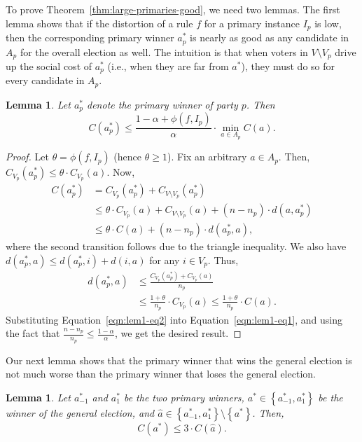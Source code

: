 \documentclass[letterpaper]{article} %
\newtheorem{lemma}[theorem]{Lemma}
\theoremstyle{definition}
\newcommand{\set}[1]{\left\{#1\right\}}
\renewcommand{\hat}{\widehat}
\newcommand{\pleft}{-1}
\newcommand{\pright}{1}
\begin{document}
To prove Theorem~\ref{thm:large-primaries-good}, we need two lemmas. The first lemma shows that if the distortion of a rule $f$ for a primary instance $I_p$ is low, then the corresponding primary winner $a^*_p$ is nearly as good as any candidate in $A_p$ for the overall election as well. The intuition is that when voters in $V \setminus V_p$ drive up the social cost of $a^*_p$ (i.e., when they are far from $a^*$), they must do so for every candidate in $A_p$.
\begin{lemma}
\label{lem:winner-opt-same-party}
	Let $a^*_p$ denote the primary winner of party $p$. Then
	$$
	C(a^*_p) \le \frac{1-\alpha+\phi(f,I_p)}{\alpha} \cdot \min_{a \in A_p} C(a).
	$$
\end{lemma}
\begin{proof}
	Let $\theta = \phi(f,I_p)$ (hence $\theta\geq 1$). Fix an arbitrary $a \in A_p$. Then, $C_{V_p}(a^*_p) \le \theta \cdot C_{V_p}(a)$. %
	Now,
	\begin{align}
	C(a^*_p) &= C_{V_p}(a^*_p) + C_{V\setminus V_{p}}(a^*_p) \nonumber\\
	&\le \theta\cdot C_{V_p}(a) + C_{V\setminus V_{p}}(a) +(n-n_{p}) \cdot d(a,a^*_p) \nonumber\\
	&\le \theta \cdot C(a) + (n-n_{p}) \cdot d(a^*_p,a),
	\label{eqn:lem1-eq1}
	\end{align}
	where the second transition follows %
	due to the triangle inequality.
	We also have $d(a^*_p,a) \le d(a^*_p,i)+d(i,a)$ for any $i \in V_p$. Thus,
	\begin{align}
	d(a^*_p,a) &\le \frac{C_{V_p}(a^*_p)+C_{V_p}(a)}{n_p} \nonumber\\
	&\le \frac{1+\theta}{n_p} \cdot C_{V_p}(a) \le \frac{1+\theta}{n_p} \cdot C(a).
	\label{eqn:lem1-eq2}
	\end{align}
	Substituting Equation~\eqref{eqn:lem1-eq2} into Equation~\eqref{eqn:lem1-eq1}, and using the fact that $\frac{n-n_{p}}{n_p} \le \frac{1-\alpha}{\alpha}$, we get the desired result.
\end{proof}
Our next lemma shows that the primary winner that wins the general election is not much worse than the primary winner that loses the general election.
\begin{lemma}
\label{lem:winners-two-parties}
	Let $a^*_{\pleft}$ and $a^*_{\pright}$ be the two primary winners, $a^* \in \set{a^*_{\pleft},a^*_{\pright}}$ be the winner of the general election, and $\hat{a} \in \set{a^*_{\pleft},a^*_{\pright}} \setminus \set{a^*}$. Then,
	$$
	C(a^*) \le 3 \cdot C(\hat{a}).
	$$
\end{lemma}
\end{document}
